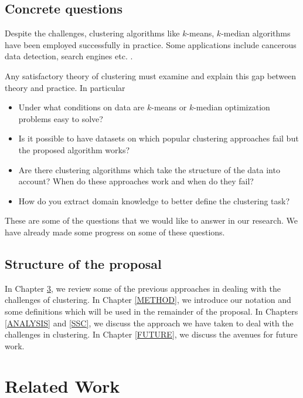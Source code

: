 \documentclass[letterpaper,12pt,titlepage,oneside,final]{book}
\begin{document}
\section{Concrete questions}
Despite the challenges, clustering algorithms like $k$-means, $k$-median algorithms have been employed successfully in practice. Some applications include cancerous data detection, search engines etc. \cite{wang2005comparison,liu2007clustering}. 

Any satisfactory theory of clustering must examine and explain this gap between theory and practice. In particular

\begin{itemize}
	\item Under what conditions on data are $k$-means or $k$-median optimization problems easy to solve?
	\item Is it possible to have datasets on which popular clustering approaches fail but the proposed algorithm works?
	\item Are there clustering algorithms which take the structure of the data into account? When do these approaches work and when do they fail?
	\item How do you extract domain knowledge to better define the clustering task?
\end{itemize}

These are some of the questions that we would like to answer in our research. We have already made some progress on some of these questions. 

\section{Structure of the proposal}
In Chapter \ref{RLW}, we review some of the previous approaches in dealing with the challenges of clustering. In Chapter \ref{METHOD}, we introduce our notation and some definitions which will be used in the remainder of the proposal. In Chapters \ref{ANALYSIS} and \ref{SSC}, we discuss the approach we have taken to deal with the challenges in clustering. In Chapter \ref{FUTURE}, we discuss the avenues for future work. 








\chapter{Related Work}
\label{RLW}
\end{document}
